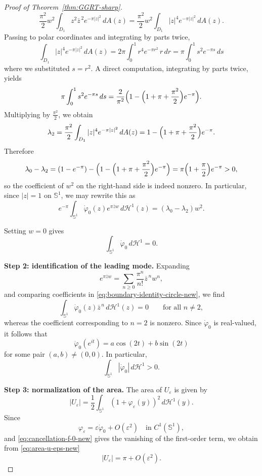 \documentclass[a4paper,11pt,reqno]{amsart}
\numberwithin{equation}{section}
\theoremstyle{plain} %
\theoremstyle{definition} %
\theoremstyle{remark}
\begin{document}
\begin{proof}[Proof of Theorem~\ref{thm:GGRT-sharp}]
\[\frac{\pi^2}{2}w^2\int_{D_1}z^2\overline z^{\,2}e^{-\pi|z|^2}\,dA(z)
=
\frac{\pi^2}{2}w^2\int_{D_1}|z|^4 e^{-\pi|z|^2}\,dA(z).
\]
Passing to polar coordinates and integrating by parts twice,
\[
\int_{D_1}|z|^4 e^{-\pi|z|^2}\,dA(z)
=
2\pi\int_0^1 r^4 e^{-\pi r^2}\,r\,dr
=
\pi\int_0^1 s^2 e^{-\pi s}\,ds
\]
where we substituted \(s=r^2\). A direct computation, integrating by parts
twice, yields
\[
\pi\int_0^1 s^2 e^{-\pi s}\,ds
=
\frac{2}{\pi^2}\Bigl(1-\Bigl(1+\pi+\frac{\pi^2}{2}\Bigr)e^{-\pi}\Bigr).
\]
Multiplying by \(\frac{\pi^2}{2}\), we obtain
\[
\lambda_2
=
\frac{\pi^2}{2}\int_{D_1}|z|^4e^{-\pi|z|^2}\,dA(z)
=
1-\Bigl(1+\pi+\frac{\pi^2}{2}\Bigr)e^{-\pi}.
\]
Therefore
\[
\lambda_0-\lambda_2
=
(1-e^{-\pi})-\Bigl(1-\Bigl(1+\pi+\frac{\pi^2}{2}\Bigr)e^{-\pi}\Bigr)
=
\pi\Bigl(1+\frac{\pi}{2}\Bigr)e^{-\pi}>0,
\]
so the coefficient of \(w^2\) on the right-hand side is indeed nonzero.
In particular, since $|z|=1$ on $\mathbb S^1$, we may rewrite this as
\begin{equation}\label{eq:boundary-identity-circle-new}
e^{-\pi}
\int_{\mathbb S^1}
\dot\varphi_0(z)e^{\pi \overline zw}\,d\mathcal H^1(z)
=
(\lambda_0-\lambda_2)w^2.
\end{equation}

Setting $w=0$ gives
\begin{equation}\label{eq:cancellation-f-0-new}
\int_{\mathbb S^1}\dot\varphi_0\,d\mathcal H^1=0.
\end{equation}

\medskip
\noindent
{\bf Step 2: identification of the leading mode.} Expanding
\[
e^{\pi \overline zw}
=
\sum_{n\geq 0}\frac{\pi^n}{n!}\overline z^{\,n}w^n,
\]
and comparing coefficients in \eqref{eq:boundary-identity-circle-new}, we find
\[
\int_{\mathbb S^1}\dot\varphi_0(z)\overline z^{\,n}\,d\mathcal H^1(z)=0
\qquad \text{for all } n\neq 2,
\]
whereas the coefficient corresponding to $n=2$ is nonzero. Since
$\dot\varphi_0$ is real-valued, it follows that
\begin{equation}\label{eq:mode-decomposition-new}
\dot\varphi_0(e^{it})
=
a\cos(2t)+b\sin(2t)
\end{equation}
for some pair $(a,b)\neq (0,0)$. In particular,
\begin{equation}\label{eq:l1-nontrivial-new}
\int_{\mathbb S^1} |\dot\varphi_0|\,d\mathcal H^1>0.
\end{equation}

\medskip
\noindent
{\bf Step 3: normalization of the area.} The area of $U_\varepsilon$ is given by
\begin{equation}\label{eq:area-u-eps-new}
|U_\varepsilon|
=
\frac12\int_{\mathbb S^1} (1+\varphi_\varepsilon(y))^2\,d\mathcal H^1(y).
\end{equation}
Since
\[
\varphi_\varepsilon
=
\varepsilon \dot\varphi_0 + O(\varepsilon^2)
\quad \text{in } C^1(\mathbb S^1),
\]
and \eqref{eq:cancellation-f-0-new} gives the vanishing of the first-order
term, we obtain from \eqref{eq:area-u-eps-new}
\begin{equation}\label{eq:measure-close-u-eps-new}
|U_\varepsilon|=\pi+O(\varepsilon^2).
\end{equation}


\end{proof}
\end{document}
